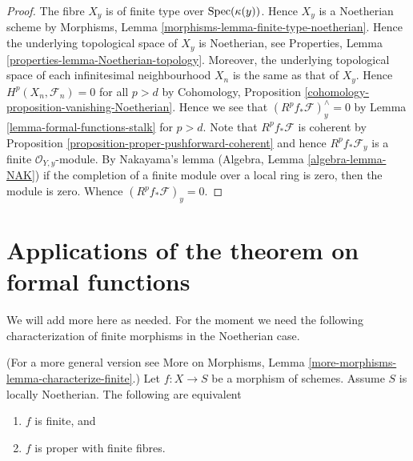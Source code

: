 \begin{proof}
The fibre $X_y$ is of finite type over $\mathop{\mathrm{Spec}}(\kappa(y))$.
Hence $X_y$ is a Noetherian scheme by
Morphisms, Lemma \ref{morphisms-lemma-finite-type-noetherian}.
Hence the underlying topological space of $X_y$ is Noetherian, see
Properties, Lemma \ref{properties-lemma-Noetherian-topology}.
Moreover, the underlying topological space of each infinitesimal
neighbourhood $X_n$ is the same as that of $X_y$.
Hence $H^p(X_n, \mathcal{F}_n) = 0$ for all $p > d$ by
Cohomology, Proposition \ref{cohomology-proposition-vanishing-Noetherian}.
Hence we see that $(R^pf_*\mathcal{F})_y^\wedge = 0$
by Lemma \ref{lemma-formal-functions-stalk} for $p > d$.
Note that $R^pf_*\mathcal{F}$ is coherent by
Proposition \ref{proposition-proper-pushforward-coherent} and
hence $R^pf_*\mathcal{F}_y$ is a finite
$\mathcal{O}_{Y, y}$-module. By Nakayama's lemma
(Algebra, Lemma \ref{algebra-lemma-NAK})
if the completion of a finite module over a local ring
is zero, then the module is zero. Whence
$(R^pf_*\mathcal{F})_y = 0$.
\end{proof}








\section{Applications of the theorem on formal functions}
\label{section-applications-formal-functions}


\noindent
We will add more here as needed. For the moment we need the
following characterization of finite morphisms in the Noetherian case.

\begin{lemma}
\label{lemma-characterize-finite}
(For a more general version see
More on Morphisms, Lemma \ref{more-morphisms-lemma-characterize-finite}.)
Let $f : X \to S$ be a morphism of schemes.
Assume $S$ is locally Noetherian.
The following are equivalent
\begin{enumerate}
\item $f$ is finite, and
\item $f$ is proper with finite fibres.
\end{enumerate}
\end{lemma}

